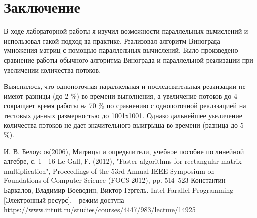 \documentclass[a4paper,12pt]{report}
\begin{document}
    \newpage

    \chapter*{Заключение}
        \label{sec:conclusion_part}
        
			В ходе лабораторной работы я изучил возможности параллельных вычислений и использовал такой подход на практике. 
			Реализовал алгоритм Винограда умножения матриц
			с помощью параллельных вычислений. 
			Было произведено сравнение работы обычного алгоритма Винограда и параллельной реализации при увеличении количества потоков.
			
			Выяснилось, что однопоточная параллельная и последовательная реализации не имеют разницы (до 2 \%) во времени выполнения, а увеличение потоков до 4 сокращает время работы на 70 \% по сравнению с однопоточной реализацией на тестовых данных размерностью до 1001x1001. 
			Однако дальнейшее увеличение количества потоков не дает значительного выигрыша во времени (разница до 5 \%). 

	\newpage

		\begin{thebibliography}{3}
			И. В. Белоусов(2006), Матрицы и определители, учебное пособие по линейной алгебре, с. 1 - 16
			Le Gall, F. (2012), "Faster algorithms for rectangular matrix multiplication", Proceedings of the 53rd Annual IEEE Symposium on Foundations of Computer Science (FOCS 2012), pp. 514–523
			Константин Баркалов, Владимир Воеводин, Виктор Гергель. Intel Parallel Programming [Электронный ресурс], - режим доступа https://www.intuit.ru/studies/courses/4447/983/lecture/14925
		\end{thebibliography}
       
\end{document}
